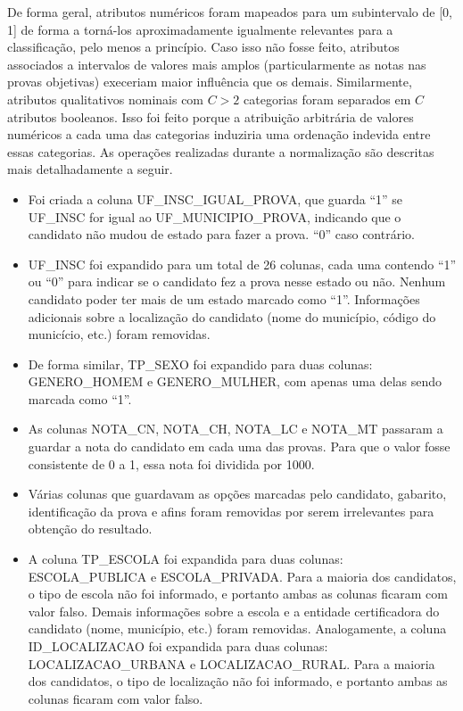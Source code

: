\documentclass[12pt]{article}
\begin{document}
De forma geral, atributos numéricos foram mapeados para um subintervalo de [0, 1] de forma a torná-los aproximadamente igualmente relevantes para a classificação, pelo menos a princípio.
Caso isso não fosse feito, atributos associados a intervalos de valores mais amplos (particularmente as notas nas provas objetivas) execeriam maior influência que os demais.
Similarmente, atributos qualitativos nominais com $C > 2$ categorias foram separados em $C$ atributos booleanos.
Isso foi feito porque a atribuição arbitrária de valores numéricos a cada uma das categorias induziria uma ordenação indevida entre essas categorias.
As operações realizadas durante a normalização são descritas mais detalhadamente a seguir.

\begin{itemize}
    \item Foi criada a coluna UF\_INSC\_IGUAL\_PROVA, que guarda ``1'' se UF\_INSC for igual ao UF\_MUNICIPIO\_PROVA, indicando que o candidato não mudou de estado para fazer a prova. ``0'' caso contrário.
    \item UF\_INSC foi expandido para um total de 26 colunas, cada uma contendo ``1'' ou ``0'' para indicar se o candidato fez a prova nesse estado ou não. Nenhum candidato poder ter mais de um estado marcado como ``1''. Informações adicionais sobre a localização do candidato (nome do município, código do municício, etc.) foram removidas.
    \item De forma similar, TP\_SEXO foi expandido para duas colunas: GENERO\_HOMEM e GENERO\_MULHER, com apenas uma delas sendo marcada como ``1''.
    \item As colunas NOTA\_CN, NOTA\_CH, NOTA\_LC e NOTA\_MT passaram a guardar a nota do candidato em cada uma das provas. Para que o valor fosse consistente de 0 a 1, essa nota foi dividida por 1000.
    \item Várias colunas que guardavam as opções marcadas pelo candidato, gabarito, identificação da prova e afins foram removidas por serem irrelevantes para obtenção do resultado.
    \item A coluna TP\_ESCOLA foi expandida para duas colunas: ESCOLA\_PUBLICA e ESCOLA\_PRIVADA. Para a maioria dos candidatos, o tipo de escola não foi informado, e portanto ambas as colunas ficaram com valor falso. Demais informações sobre a escola e a entidade certificadora do candidato (nome, município, etc.) foram removidas.
    Analogamente, a coluna  ID\_LOCALIZACAO foi expandida para duas colunas: LOCALIZACAO\_URBANA e LOCALIZACAO\_RURAL. Para a maioria dos candidatos, o tipo de localização não foi informado, e portanto ambas as colunas ficaram com valor falso.

\end{itemize}
\end{document}
